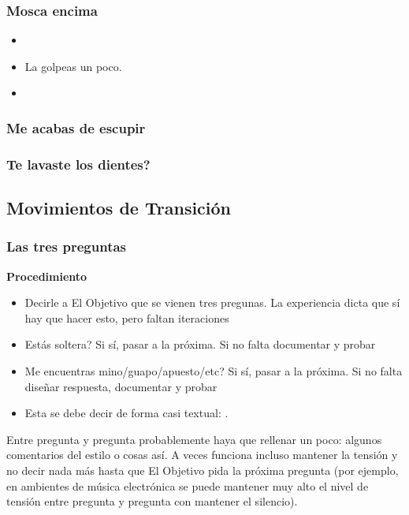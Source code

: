 \documentclass{article}
\begin{document}
\subsubsection{Mosca encima}
\begin{itemize}
\item {}
\item La golpeas un poco.
\item {}
\end{itemize}

\subsubsection{Me acabas de escupir}

\subsubsection{Te lavaste los dientes?}
\subsection{Movimientos de Transición \label{ssec:movimientosTransicion}}

\subsubsection{Las tres preguntas}

\textbf{Procedimiento}
\begin{itemize}
\item Decirle a El Objetivo que se vienen tres pregunas. {\color{red} La experiencia dicta que sí hay que hacer esto, pero faltan iteraciones}
\item Estás soltera? Si sí, pasar a la próxima. Si no {\color{red}falta documentar y probar}
\item Me encuentras mino/guapo/apuesto/etc? Si sí, pasar a la próxima. Si no {\color{red}falta diseñar respuesta, documentar y probar}
\item Esta se debe decir de forma casi textual: .
\end{itemize}
Entre pregunta y pregunta probablemente haya que rellenar un poco: algunos comentarios del estilo  o cosas así. A veces funciona incluso mantener la tensión y no decir nada más hasta que El Objetivo pida la próxima pregunta (por ejemplo, en ambientes de música electrónica se puede mantener muy alto el nivel de tensión entre pregunta y pregunta con mantener el silencio).
\end{document}
